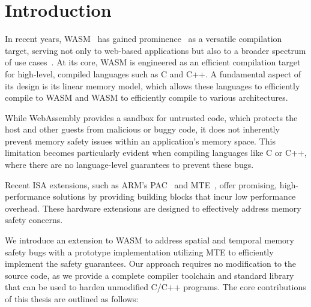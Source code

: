 \chapter{Introduction}
\label{ch:intro}

In recent years, \ac{WASM}~\cite{haas2017bringing} has gained prominence~\cite{musch2019new} as a versatile compilation target, serving not only to web-based applications but also to a broader spectrum of use cases~\cite{wasm_use_cases}.
At its core, \ac{WASM} is engineered as an efficient compilation target for high-level, compiled languages such as C and C++.
A fundamental aspect of its design is its linear memory model, which allows these languages to efficiently compile to \ac{WASM} and \ac{WASM} to efficiently compile to various architectures.

While WebAssembly provides a sandbox for untrusted code, which protects the host and other guests from malicious or buggy code, it does not inherently prevent memory safety issues within an application's memory space.
This limitation becomes particularly evident when compiling languages like C or C++, where there are no language-level guarantees to prevent these bugs.

Recent \acs{ISA} extensions, such as ARM's \ac{PAC}~\cite{Qualcomm2017PointerAuth} and \acf{MTE}~\cite{ARM2019MTE}, offer promising, high-performance solutions by providing building blocks that incur low performance overhead.
These hardware extensions are designed to effectively address memory safety concerns.

We introduce an extension to \ac{WASM} to address spatial and temporal memory safety bugs with a prototype implementation utilizing \ac{MTE} to efficiently implement the safety guarantees.
Our approach requires no modification to the source code, as we provide a complete compiler toolchain and standard library that can be used to harden unmodified C/C++ programs.
The core contributions of this thesis are outlined as follows:

